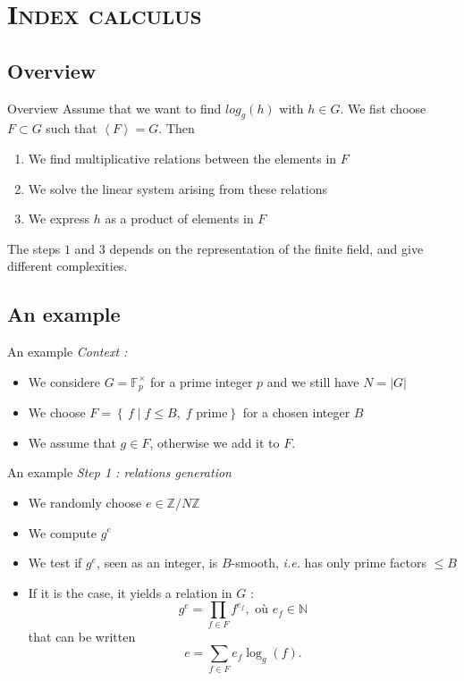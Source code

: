 \documentclass[xcolor=x11names,compress]{beamer}
\theoremstyle{break}
\theoremstyle{sc}
\theoremstyle{definition}
\theoremstyle{remark}
\newcommand{\ie}{\emph{i.e. }}
\begin{document}
\section{\scshape Index calculus}
\subsection{Overview}
\begin{frame}{Overview}
  Assume that we want to find $log_g(h)$ with $h\in G$. We fist choose $F\subset
  G$ such that $\left\langle F \right\rangle = G$. Then
  \begin{enumerate}
    \item We find multiplicative relations between the elements in $F$
    \item We solve the linear system arising from these relations
    \item We express $h$ as a product of elements in $F$
  \end{enumerate}
  The steps $1$ and $3$ depends on the representation of the finite field, and
  give different complexities.
\end{frame}

\subsection{An example}
\begin{frame}{An example}
  \emph{Context :}
  \begin{itemize}
    \item We considere $G = \mathbb{F}_p^\times$ for a prime integer $p$ and we
      still have $N = |G|$
    \item We choose $F = \left\{\, f \;|\; f \leq B,\; f \text{ prime}
    \right\}$ for a chosen integer $B$
  \item We assume that $g\in F$, otherwise we add it to $F$.
  \end{itemize}
\end{frame}

\begin{frame}{An example}
  \emph{Step 1 : relations generation}
  \begin{itemize}
    \item We randomly choose $e\in \mathbb{Z}/N\mathbb{Z}$
    \item We compute $g^e$
    \item We test if $g^e$, seen as an integer, is $B$-smooth, \ie has only
      prime factors $\leq B$
    \item If it is the case, it yields a relation in $G$ :
      \[ 
        g^e = \prod_{f\in F}f^{e_f}, \text{ où } e_f\in \mathbb{N}
      \]
      that can be written
      \[
        e = \sum_{f\in F}e_f\log_g(f).
      \]
  \end{itemize}
\end{frame}
\end{document}
